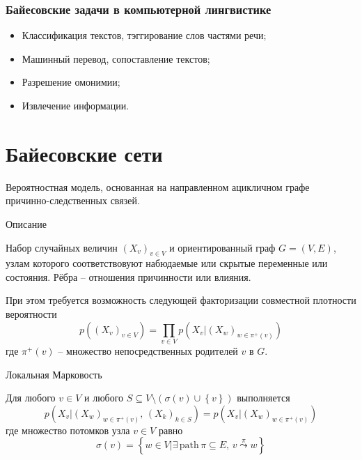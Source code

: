\documentclass{beamer}
\newcommand{\obj}[1]{\left\{ #1 \right \}}
\newcommand{\brac}[1]{\left ( #1 \right )}
\newcommand{\induc}[1]{\left . #1 \right \vert}
\begin{document}
\begin{frame}\frametitle{Байесовские задачи в компьютерной лингвистике}

  \begin{block}

  \begin{itemize}
    \item Классификация текстов, тэггирование слов частями речи;
    \item Машинный перевод, сопоставление текстов;
    \item Разрешение омонимии;
    \item Извлечение информации.
  \end{itemize}
  \end{block}
\end{frame}



\section{Байесовские сети} %
\label{sec:bayesian_networks}

\begin{frame}
  \begin{block}
  
    Вероятностная модель, основанная на направленном ацикличном графе причинно-следственных связей.
  \end{block}
  \begin{block}{Описание}

    Набор случайных величин $\brac{X_v}_{v\in V}$ и ориентированный граф $G=(V,E)$, узлам которого соответствовуют набюдаемые или скрытые переменные или состояния. Рёбра -- отношения причинности или влияния.

    При этом требуется возможность следующей факторизации совместной плотности вероятности
    \[p\brac{\brac{X_v}_{v\in V}} = \prod_{v\in V} p\brac{\induc{X_v} \brac{X_w}_{w\in\pi^+(v)}}\]
    где $\pi^+(v)$ -- множество непосредственных родителей $v$ в $G$.
  \end{block}
\end{frame}

\begin{frame}
  \begin{block}{Локальная Марковость}

    Для любого $v\in V$ и любого $S\subseteq V\setminus\brac{\sigma(v)\cup\obj{v}}$ выполняется
    \[p\brac{\induc{X_v}\brac{X_w}_{w\in \pi^+(v)},\,\brac{X_k}_{k\in S} } = p\brac{\induc{X_v}\brac{X_w}_{w\in \pi^+(v)} }\]
    где множество потомков узла $v\in V$ равно
    \[\sigma(v) = \obj{\induc{w\in V} \exists\,\text{path}\,\pi\subseteq E,\, v\overset{\pi}{\leadsto}w}\]
    
  \end{block}

\end{frame}
\end{document}
